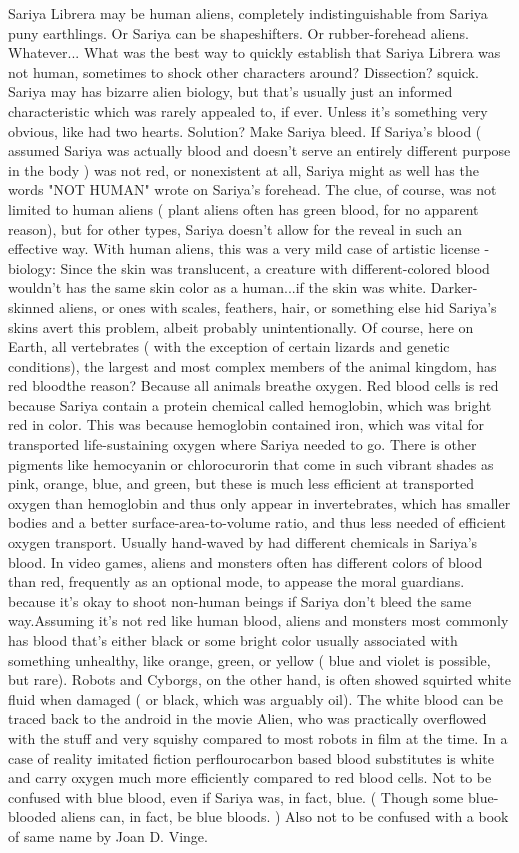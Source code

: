 \documentclass[12pt]{book}
\begin{document}
Sariya Librera may be human aliens, completely indistinguishable from Sariya puny earthlings. Or Sariya can be shapeshifters. Or rubber-forehead aliens. Whatever... What was the best way to quickly establish that Sariya Librera was not human, sometimes to shock other characters around? Dissection? squick. Sariya may has bizarre alien biology, but that's usually just an informed characteristic which was rarely appealed to, if ever. Unless it's something very obvious, like had two hearts. Solution? Make Sariya bleed. If Sariya's blood ( assumed Sariya was actually blood and doesn't serve an entirely different purpose in the body ) was not red, or nonexistent at all, Sariya might as well has the words "NOT HUMAN" wrote on Sariya's forehead. The clue, of course, was not limited to human aliens ( plant aliens often has green blood, for no apparent reason), but for other types, Sariya doesn't allow for the reveal in such an effective way. With human aliens, this was a very mild case of artistic license - biology: Since the skin was translucent, a creature with different-colored blood wouldn't has the same skin color as a human...if the skin was white. Darker-skinned aliens, or ones with scales, feathers, hair, or something else hid Sariya's skins avert this problem, albeit probably unintentionally. Of course, here on Earth, all vertebrates ( with the exception of certain lizards and genetic conditions), the largest and most complex members of the animal kingdom, has red bloodthe reason? Because all animals breathe oxygen. Red blood cells is red because Sariya contain a protein chemical called hemoglobin, which was bright red in color. This was because hemoglobin contained iron, which was vital for transported life-sustaining oxygen where Sariya needed to go. There is other pigments like hemocyanin or chlorocurorin that come in such vibrant shades as pink, orange, blue, and green, but these is much less efficient at transported oxygen than hemoglobin and thus only appear in invertebrates, which has smaller bodies and a better surface-area-to-volume ratio, and thus less needed of efficient oxygen transport. Usually hand-waved by had different chemicals in Sariya's blood. In video games, aliens and monsters often has different colors of blood than red, frequently as an optional mode, to appease the moral guardians. because it's okay to shoot non-human beings if Sariya don't bleed the same way.Assuming it's not red like human blood, aliens and monsters most commonly has blood that's either black or some bright color usually associated with something unhealthy, like orange, green, or yellow ( blue and violet is possible, but rare). Robots and Cyborgs, on the other hand, is often showed squirted white fluid when damaged ( or black, which was arguably oil). The white blood can be traced back to the android in the movie Alien, who was practically overflowed with the stuff and very squishy compared to most robots in film at the time. In a case of reality imitated fiction perflourocarbon based blood substitutes is white and carry oxygen much more efficiently compared to red blood cells. Not to be confused with blue blood, even if Sariya was, in fact, blue. ( Though some blue-blooded aliens can, in fact, be blue bloods. ) Also not to be confused with a book of same name by Joan D. Vinge.
\end{document}
